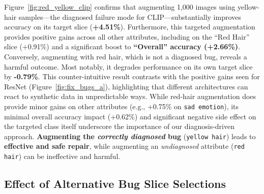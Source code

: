 \documentclass[10pt]{article} %
\begin{document}
Figure~\ref{fig:red_yellow_clip} confirms that augmenting 1{,}000 images using yellow-hair samples—the diagnosed failure mode for CLIP—substantially improves accuracy on its target slice (\textbf{+4.51\%}). Furthermore, this targeted augmentation provides positive gains across all other attributes, including on the ``Red Hair'' slice (+0.91\%) and a significant boost to \textbf{``Overall'' accuracy (+2.66\%)}. 
Conversely, augmenting with red hair, which is not a diagnosed bug, reveals a harmful outcome. Most notably, it degrades performance on its own target slice by \textbf{-0.79\%}. This counter-intuitive result contrasts with the positive gains seen for ResNet (Figure~\ref{fig:fix_bugs_a}), highlighting that different architectures can react to synthetic data in unpredictable ways. 
While red-hair augmentation does provide minor gains on other attributes (e.g., +0.75\% on \texttt{sad emotion}), its minimal overall accuracy impact (+0.62\%) and significant negative side effect on the targeted class itself underscore the importance of our diagnosis-driven approach. \textbf{Augmenting the \textit{correctly diagnosed} bug} (\texttt{yellow hair}) leads to \textbf{effective and safe repair}, while augmenting an \textit{undiagnosed} attribute (\texttt{red hair}) can be ineffective and harmful.

\vspace{10pt}
\subsection{Effect of Alternative Bug Slice Selections}



\begin{table}[t]
\centering
\footnotesize
\renewcommand{\arraystretch}{0.95}
\vspace{4pt}
\caption{RER (\%) for attribute-variant selections. Ours is the RH\_BS\_SE combination.}
\label{tab:base_and_attribute_variants}
\vspace{4pt}
\end{table}
\end{document}
